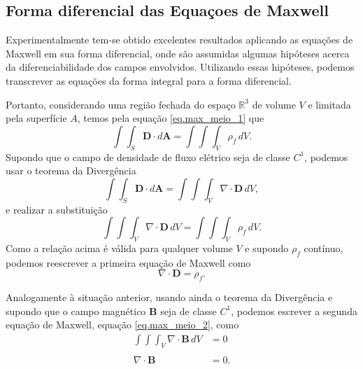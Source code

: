 \subsection{Forma diferencial das Equa\c{c}oes de Maxwell}

Experimentalmente tem-se obtido excelentes resultados aplicando as equa\c{c}\~oes de Maxwell em sua forma diferencial, onde s\~ao assumidas algumas hip\'oteses acerca da diferenciabilidade dos campos envolvidos. Utilizando essas hip\'oteses, podemos transcrever as equa\c{c}\~oes da forma integral para a forma diferencial.

Portanto, considerando uma regi\~ao fechada do espa\c{c}o $\mathbb{R}^3$ de volume $V$ e limitada pela superf\'icie $A$, temos pela equa\c{c}\~ao \ref{eq.max_meio_1} que
\begin{equation*}
\int\int_S\mathbf{D}\cdot d\mathbf{A}=\int\int\int_{V}\rho_f\,dV.
\end{equation*}
Supondo que o campo de densidade de fluxo el\'etrico seja de classe $C^1$, podemos usar o teorema da Diverg\^encia
\begin{equation*}
\int\int_S\mathbf{D}\cdot d\mathbf{A}=\int\int\int_V\nabla\cdot\mathbf{D}\,dV,
\end{equation*}
e realizar a substitui\c{c}\~ao
\begin{equation*}
\int\int\int_V\nabla\cdot\mathbf{D}\,dV=\int\int\int_{V}\rho_f\,dV.
\end{equation*}
Como a rela\c{c}\~ao acima \'e v\'alida para qualquer volume $V$ e supondo $\rho_f$ cont\'inuo, podemos reescrever a primeira equa\c{c}\~ao de Maxwell como
\begin{equation*}
\nabla\cdot\mathbf{D}=\rho_f.
\end{equation*}

Analogamente \`a situa\c{c}\~ao anterior, usando ainda o teorema da Diverg\^encia e supondo que o campo magn\'etico $\mathbf{B}$ seja de classe $C^1$, podemos escrever a segunda equa\c{c}\~ao de Maxwell, equa\c{c}\~ao \ref{eq.max_meio_2}, como
\begin{align*}
\int\int\int_V\nabla\cdot\mathbf{B}\,dV&=0\\\\
\nabla\cdot\mathbf{B}&=0.
\end{align*}

